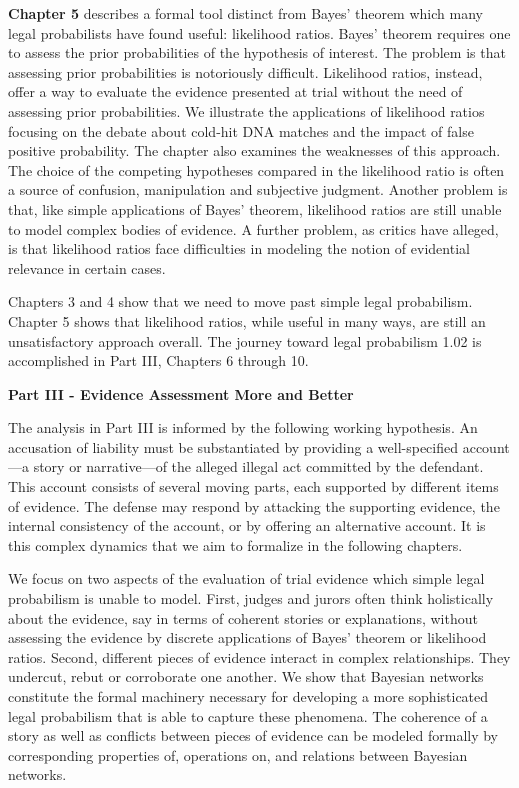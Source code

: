 \documentclass[
  10pt,
  dvipsnames,enabledeprecatedfontcommands]{scrartcl}
\begin{document}
\textbf{Chapter 5} describes a formal tool distinct from Bayes' theorem
which many legal probabilists have found useful: likelihood ratios.
Bayes' theorem requires one to assess the prior probabilities of the
hypothesis of interest. The problem is that assessing prior
probabilities is notoriously difficult. Likelihood ratios, instead,
offer a way to evaluate the evidence presented at trial without the need
of assessing prior probabilities. We illustrate the applications of
likelihood ratios focusing on the debate about cold-hit DNA matches and
the impact of false positive probability. The chapter also examines the
weaknesses of this approach. The choice of the competing hypotheses
compared in the likelihood ratio is often a source of confusion,
manipulation and subjective judgment. Another problem is that, like
simple applications of Bayes' theorem, likelihood ratios are still
unable to model complex bodies of evidence. A further problem, as
critics have alleged, is that likelihood ratios face difficulties in
modeling the notion of evidential relevance in certain cases.

Chapters 3 and 4 show that we need to move past simple legal
probabilism. Chapter 5 shows that likelihood ratios, while useful in
many ways, are still an unsatisfactory approach overall. The journey
toward legal probabilism 1.02 is accomplished in Part III, Chapters 6
through 10.

\vspace{3mm}

\noindent \textbf{Part III - Evidence Assessment More and Better}

\noindent The analysis in Part III is informed by the following working
hypothesis. An accusation of liability must be substantiated by
providing a well-specified account---a story or narrative---of the
alleged illegal act committed by the defendant. This account consists of
several moving parts, each supported by different items of evidence. The
defense may respond by attacking the supporting evidence, the internal
consistency of the account, or by offering an alternative account. It is
this complex dynamics that we aim to formalize in the following
chapters.

We focus on two aspects of the evaluation of trial evidence which simple
legal probabilism is unable to model. First, judges and jurors often
think holistically about the evidence, say in terms of coherent stories
or explanations, without assessing the evidence by discrete applications
of Bayes' theorem or likelihood ratios. Second, different pieces of
evidence interact in complex relationships. They undercut, rebut or
corroborate one another. We show that Bayesian networks constitute the
formal machinery necessary for developing a more sophisticated legal
probabilism that is able to capture these phenomena. The coherence of a
story as well as conflicts between pieces of evidence can be modeled
formally by corresponding properties of, operations on, and relations
between Bayesian networks.
\end{document}
